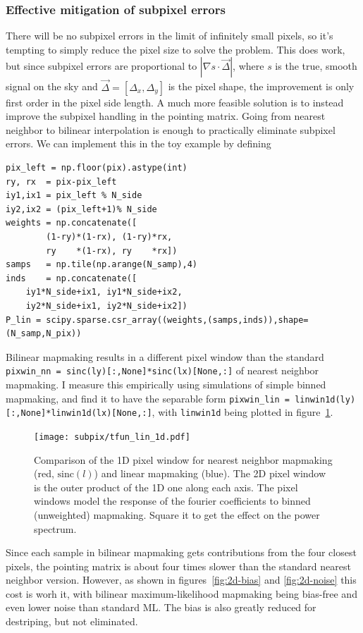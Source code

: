 \documentclass[twocolumn,apj]{aastex63}
\begin{document}
\subsubsection{Effective mitigation of subpixel errors}
There will be no subpixel errors in the limit of infinitely small pixels,
so it's tempting to simply reduce the pixel size to solve the problem. This
does work, but since subpixel errors are proportional to $|\nabla s \cdot \vec \Delta|$,
where $s$ is the true, smooth signal on the sky and $\vec \Delta = [\Delta_x,\Delta_y]$
is the pixel shape, the improvement is only first order in the pixel side length.
A much more feasible solution is to instead improve the subpixel handling in the
pointing matrix. Going from nearest neighbor to bilinear interpolation is enough
to practically eliminate subpixel errors. We can implement this in the toy example
by defining
\begin{lstlisting}
pix_left = np.floor(pix).astype(int)
ry, rx  = pix-pix_left
iy1,ix1 = pix_left % N_side
iy2,ix2 = (pix_left+1)% N_side
weights = np.concatenate([
		(1-ry)*(1-rx), (1-ry)*rx,
		ry    *(1-rx), ry    *rx])
samps   = np.tile(np.arange(N_samp),4)
inds    = np.concatenate([
	iy1*N_side+ix1, iy1*N_side+ix2,
	iy2*N_side+ix1, iy2*N_side+ix2])
P_lin = scipy.sparse.csr_array((weights,(samps,inds)),shape=(N_samp,N_pix))
\end{lstlisting}
Bilinear mapmaking results in a different pixel window than
the standard \lstinline{pixwin_nn = sinc(ly)[:,None]*sinc(lx)[None,:]}
of nearest neighbor mapmaking. I measure this empirically using simulations
of simple binned mapmaking, and find it to have the separable form
\lstinline{pixwin_lin = linwin1d(ly)[:,None]*linwin1d(lx)[None,:]},
with \lstinline{linwin1d} being plotted in figure~\ref{fig:linwin1d}.

\begin{figure}
	\centering
	\texttt{[image: subpix/tfun\_lin\_1d.pdf]}
	\caption{Comparison of the 1D pixel window for nearest neighbor
	mapmaking (red, $\text{sinc}(l)$) and linear mapmaking (blue). The 2D pixel window
	is the outer product of the 1D one along each axis. The pixel
	windows model the response of the fourier coefficients to
	binned (unweighted) mapmaking. Square it to get the effect on
	the power spectrum.}
	\label{fig:linwin1d}
\end{figure}

Since each sample in bilinear mapmaking gets contributions from the four closest pixels,
the pointing matrix is about four times slower than the standard nearest neighbor
version. However, as shown in figures~\ref{fig:2d-bias} and \ref{fig:2d-noise}
this cost is worh it, with bilinear maximum-likelihood mapmaking being bias-free
and even lower noise than standard ML. The bias is also greatly reduced for
destriping, but not eliminated.
\end{document}
